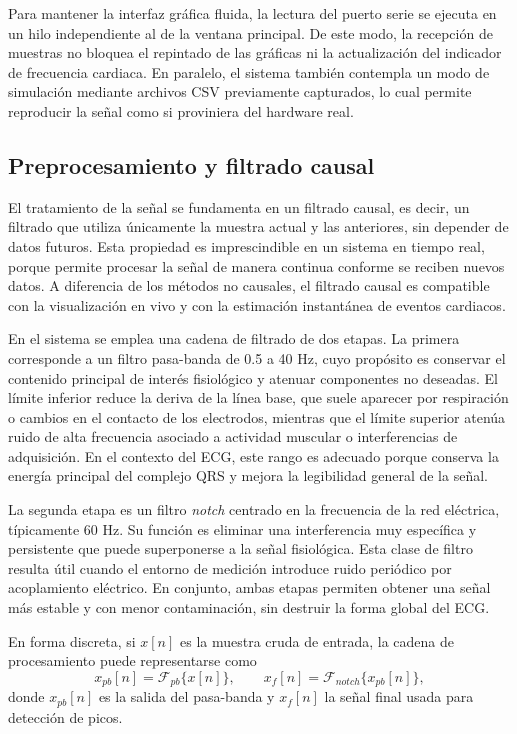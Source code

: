 Para mantener la interfaz gráfica fluida, la lectura del puerto serie se ejecuta en un hilo independiente al de la ventana principal. De este modo, la recepción de muestras no bloquea el repintado de las gráficas ni la actualización del indicador de frecuencia cardiaca. En paralelo, el sistema también contempla un modo de simulación mediante archivos CSV previamente capturados, lo cual permite reproducir la señal como si proviniera del hardware real.

\subsection{Preprocesamiento y filtrado causal}

El tratamiento de la señal se fundamenta en un filtrado causal, es decir, un filtrado que utiliza únicamente la muestra actual y las anteriores, sin depender de datos futuros. Esta propiedad es imprescindible en un sistema en tiempo real, porque permite procesar la señal de manera continua conforme se reciben nuevos datos. A diferencia de los métodos no causales, el filtrado causal es compatible con la visualización en vivo y con la estimación instantánea de eventos cardiacos.

En el sistema se emplea una cadena de filtrado de dos etapas. La primera corresponde a un filtro pasa-banda de 0.5 a 40 Hz, cuyo propósito es conservar el contenido principal de interés fisiológico y atenuar componentes no deseadas. El límite inferior reduce la deriva de la línea base, que suele aparecer por respiración o cambios en el contacto de los electrodos, mientras que el límite superior atenúa ruido de alta frecuencia asociado a actividad muscular o interferencias de adquisición. En el contexto del ECG, este rango es adecuado porque conserva la energía principal del complejo QRS y mejora la legibilidad general de la señal.

La segunda etapa es un filtro \textit{notch} centrado en la frecuencia de la red eléctrica, típicamente 60 Hz. Su función es eliminar una interferencia muy específica y persistente que puede superponerse a la señal fisiológica. Esta clase de filtro resulta útil cuando el entorno de medición introduce ruido periódico por acoplamiento eléctrico. En conjunto, ambas etapas permiten obtener una señal más estable y con menor contaminación, sin destruir la forma global del ECG.

En forma discreta, si $x[n]$ es la muestra cruda de entrada, la cadena de procesamiento puede representarse como
\[
x_{pb}[n] = \mathcal{F}_{pb}\{x[n]\}, \qquad x_f[n] = \mathcal{F}_{notch}\{x_{pb}[n]\},
\]
donde $x_{pb}[n]$ es la salida del pasa-banda y $x_f[n]$ la señal final usada para detección de picos.

